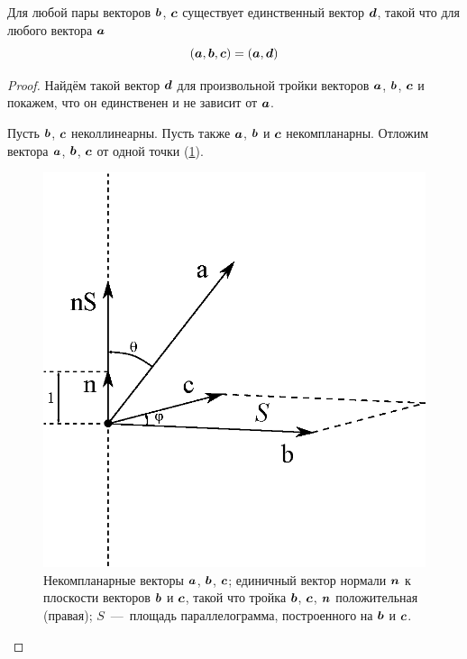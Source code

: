 \documentclass[a4paper,12pt]{article}
\begin{document}
  \begin{theorem}
    Для любой пары векторов $\boldsymbol b$, $\boldsymbol c$ существует единственный вектор $\boldsymbol d$, такой что для любого вектора $\boldsymbol a$
    \[
      (\boldsymbol a, \boldsymbol b, \boldsymbol c) = (\boldsymbol a, \boldsymbol d)
    \]
  \end{theorem}
  
  \begin{proof}
    Найдём такой вектор $\boldsymbol d$ для произвольной тройки векторов $\boldsymbol a$, $\boldsymbol b$, $\boldsymbol c$ и покажем, что он единственен и не зависит от $\boldsymbol a$.
    
    Пусть $\boldsymbol b$, $\boldsymbol c$ неколлинеарны.
    Пусть также $\boldsymbol a$, $\boldsymbol b$ и $\boldsymbol c$ некомпланарны.
    Отложим вектора $\boldsymbol a$, $\boldsymbol b$, $\boldsymbol c$ от одной точки (\ref{fig:triple-product}).
    
    \begin{figure}[h]
      \centering
      
      \includegraphics[width=0.5\columnwidth]{triple-product}
      
      \caption{Некомпланарные векторы $\boldsymbol a$, $\boldsymbol b$, $\boldsymbol c$; единичный вектор нормали $\boldsymbol n$ к плоскости векторов $\boldsymbol b$ и $\boldsymbol c$, такой что тройка $\boldsymbol b$, $\boldsymbol c$, $\boldsymbol n$ положительная (правая); $S$~---~площадь параллелограмма, построенного на $\boldsymbol b$ и $\boldsymbol c$.}
      \label{fig:triple-product}
    \end{figure}
  

\end{proof}
\end{document}

